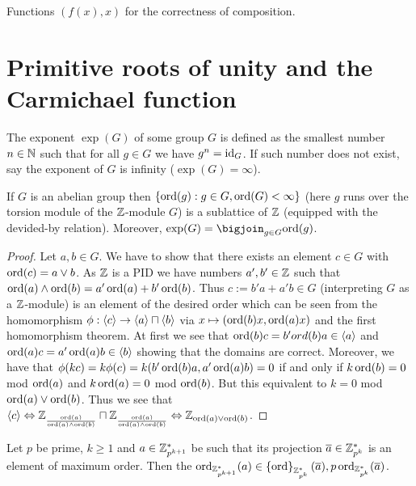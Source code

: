 \documentclass[8pt,a4paper]{article}
\begin{document}
Functions $(f(x),x)$ for the correctness of composition.

\section{Primitive roots of unity and the Carmichael function}

\begin{definition}
    The exponent $\exp(G)$ of some group $G$ is defined as the smallest number $n\in\mathbb{N}$ such that for all $g\in G$ we have $g^n=\mathop\mathrm{id}\nolimits_G$. If such number does not exist, say the exponent of $G$ is infinity ($\exp(G)=\infty$).
\end{definition}

\begin{lemma}
    If $G$ is an abelian group then $\{\mathop\mathrm{ord}(g):g\in G, \mathop\mathrm{ord}(G)<\infty\}$ (here $g$ runs over the torsion module of the $\mathbb{Z}$-module $G$) is a sublattice of $\mathbb{Z}$ (equipped with the devided-by relation). Moreover, $\exp(G)=\bigjoin_{g\in G}{\ord(g)}$.
\end{lemma}

\begin{proof}
    Let $a,b\in G$. We have to show that there exists an element $c\in G$ with $\mathop\mathrm{ord}(c)=a\vee b$. As $\mathbb{Z}$ is a PID we have numbers $a',b'\in\mathbb{Z}$ such that $\mathop\mathrm{ord}(a)\wedge\mathop\mathrm{ord}(b)=a'\mathop\mathrm{ord}(a)+b'\mathop\mathrm{ord}(b)$. Thus $c:=b'a+a'b\in G$ (interpreting $G$ as a $\mathbb{Z}$-module) is an element of the desired order which can be seen from the homomorphism $\phi:\gen{c}\to \gen{a}\times\gen{b}$ via $x\mapsto (\mathop\mathrm{ord}(b)x,\mathop\mathrm{ord}(a)x)$ and the first homomorphism theorem.
    At first we see that $\ord(b)c=b'ord(b)a\in\gen{a}$ and $\ord(a)c=a'\ord(a)b\in\gen{b}$ showing that the domains are correct.
    Moreover, we have that $\phi(kc)=k\phi(c)=k(b'\mathop\mathrm{ord}(b)a,a'\mathop\mathrm{ord}(a)b)=0$ if and only if $k\mathop\mathrm{ord}(b)=0$ mod $\mathop\mathrm{ord}(a)$ and $k\mathop\mathrm{ord}(a)=0$ mod $\mathop\mathrm{ord}(b)$. But this equivalent to $k=0$ mod $\mathop\mathrm{ord}(a)\vee\mathop\mathrm{ord}(b)$. Thus we see that $\gen{c} \iso  \ints_{\frac{\ord(a)}{\ord(a)\meet\ord(b)}}\times\ints_{\frac{\ord(a)}{\ord(a)\meet\ord(b)}} \iso \ints_{\ord(a)\join\ord(b)}$.
\end{proof}

\begin{lemma}
    Let $p$ be prime, $k\geq 1$ and $a\in\mathbb{Z}^*_{p^{k+1}}$ be such that its projection $\overline{a}\in\mathbb{Z}^*_{p^k}$ is an element of maximum order. Then the $\ord_{\ints^*_{p^{k+1}}}(a)\in\set{\ord_{\ints^*_{p^k}}(\bar{a}),p\ord_{\ints^*_{p^k}}(\bar{a})}$.
\end{lemma}
\end{document}
